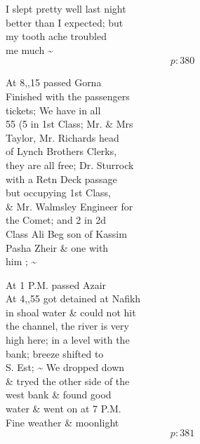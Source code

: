 \documentclass{report}
\begin{document}
	\par{
 	I slept pretty well last night\ \\better than I expected; but\ \\my tooth ache troubled\ \\me much \~{}\ \\
  \[p: 380 \]

	}





	\par{
 	At 8,,15 passed Gorna\ \\Finished with the passengers\ \\tickets; We have in all\ \\55 (5 in 1st Class; Mr. \& Mrs\ \\Taylor, Mr. Richards head\ \\of Lynch Brothers Clerks,\ \\they are all free; Dr. Sturrock\ \\with a Retn Deck passage\ \\but occupying 1st Class,\ \\\& Mr. Walmsley Engineer for\ \\the Comet; and 2 in 2d\ \\Class Ali Beg son of Kassim\ \\Pasha Zheir \& one with\ \\him ; \~{}\ \\
	}

	\par{
 	At 1 P.M. passed Azair\ \\At 4,,55 got detained at Nafikh\ \\in shoal water \& could not hit\ \\the channel, the river is very\ \\high here; in a level with the\ \\bank; breeze shifted to\ \\S. Est; \~{} We dropped down\ \\\& tryed the other side of the\ \\west bank \& found good\ \\water \& went on at 7 P.M.\ \\Fine weather \& moonlight\ \\
  \[p: 381 \]

	}
\end{document}
